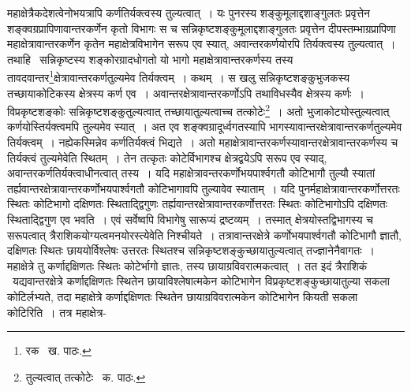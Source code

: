 \documentclass[11pt, openany]{book}
\begin{document}
\noindent महाक्षेत्रैकदेशत्वेनोभयत्रापि कर्णतिर्यक्त्वस्य तुल्यत्वात्~। यः पुनरस्य शङ्कुमूलाद्दशाङ्गुलतः प्रवृत्तेन शङ्क्वग्रप्रापिणावान्तरकर्णेन कृतो
विभागः स च सन्निकृष्टशङ्कुमूलाद्दशाङ्गुलतः प्रवृत्तेन दीपस्तम्भाग्रप्रापिणा महाक्षेत्रावान्तरकर्णेन कृतेन महाक्षेत्रविभागेन सरूप एव स्यात्, अवान्तरकर्णयोरपि तिर्यक्त्वस्य तुल्यत्वात्~। तथाहि \textendash\ सन्निकृष्टस्य शङ्कोरग्रादधोगतो यो भागो महाक्षेत्रावान्तरकर्णस्य तस्य
तावदवान्तर\renewcommand{\thefootnote}{१}\footnote{रक \textendash\ ख. पाठः.}क्षेत्रावान्तरकर्णतुल्यमेव तिर्यक्त्वम्~। कथम्~। स खलु सन्निकृष्टशङ्कुभुजकस्य तच्छायाकोटिकस्य क्षेत्रस्य कर्ण एव~। अवान्तरक्षेत्रावान्तरकर्णोऽपि तथाविधस्यैव क्षेत्रस्य कर्णः~। विप्रकृष्टशङ्कोः सन्निकृष्टशङ्कुतुल्यत्वात्  तच्छायातुल्यत्वाच्च तत्कोटेः\renewcommand{\thefootnote}{२}\footnote{तुल्यत्वात् तत्कोटेः \textendash\ क. पाठः.}~। अतो भुजाकोट्योस्तुल्यत्वात् कर्णयोस्तिर्यक्त्वमपि तुल्यमेव स्यात्~। अत एव शङ्क्वग्रादूर्ध्वगतस्यापि भागस्यावान्तरक्षेत्रावान्तरकर्णतुल्यमेव तिर्यक्त्वम्~। नह्येकस्मिन्नेव कर्णतिर्यक्त्वं भिद्यते~। अतो महाक्षेत्रावान्तरकर्णस्यावान्तरक्षेत्रावान्तरकर्णस्य च तिर्यक्त्वं तुल्यमेवेति स्थितम्~। तेन तत्कृतः कोटेर्विभागश्च क्षेत्रद्वयेऽपि सरूप एव स्याद्, अवान्तरकर्णतिर्यक्त्वाधीनत्वात् तस्य~। यदि महाक्षेत्रावन्तरकर्णोभयपार्श्वगतौ कोटिभागौ
तुल्यौ स्यातां तर्ह्यवान्तरक्षेत्रावान्तरकर्णोभयपार्श्वगतौ कोटिभागावपि तुल्यावेव स्याताम्~। यदि पुनर्महाक्षेत्रावान्तरकर्णोत्तरतः स्थितः कोटिभागो
दक्षिणतः स्थिताद्द्विगुणः तर्ह्यवान्तरक्षेत्रावान्तरकर्णोत्तरतः स्थितः कोटिभागोऽपि दक्षिणतः स्थिताद्द्विगुण एव भवति~। एवं सर्वेष्वपि विभागेषु
सारूप्यं द्रष्टव्यम्~। तस्मात् क्षेत्रयोस्तद्विभागस्य च सरूपत्वात् त्रैराशिकयोग्यत्वमनयोरस्त्येवेति निश्चीयते~। तत्रावान्तरक्षेत्रे कर्णोभयपार्श्वगतौ
कोटिभागौ ज्ञातौ, दक्षिणतः स्थितः छाययोर्विश्लेषः उत्तरतः स्थितश्च सन्निकृष्टशङ्कुच्छायातुल्यत्वात् तज्ज्ञानेनैवागतः~। महाक्षेत्रे तु कर्णाद्दक्षिणतः स्थितः कोटेर्भागो ज्ञातः, तस्य छायाग्रविवरात्मकत्वात्~। तत इदं त्रैराशिकं \textendash\ यद्यवान्तरक्षेत्रे कर्णाद्दक्षिणतः स्थितेन छायाविश्लेषात्मकेन कोटिभागेन विप्रकृष्टशङ्कुच्छायातुल्या सकला कोटिर्लभ्यते, तदा महाक्षेत्रे कर्णाद्दक्षिणतः स्थितेन छायाग्रविवरात्मकेन कोटिभागेन कियती सकला कोटिरिति~। तत्र महाक्षेत्र-

\newpage
\end{document}
